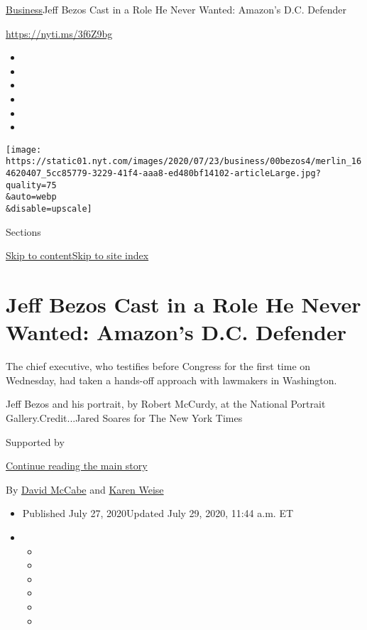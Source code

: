 \href{/section/business}{Business}\textbar{}Jeff Bezos Cast in a Role He
Never Wanted: Amazon's D.C. Defender

\url{https://nyti.ms/3f6Z9bg}

\begin{itemize}
\item
\item
\item
\item
\item
\item
\end{itemize}

\texttt{[image: https://static01.nyt.com/images/2020/07/23/business/00bezos4/merlin\_164620407\_5cc85779-3229-41f4-aaa8-ed480bf14102-articleLarge.jpg?quality=75\\\&auto=webp\\\&disable=upscale]}

Sections

\protect\hyperlink{site-content}{Skip to
content}\protect\hyperlink{site-index}{Skip to site index}

\hypertarget{jeff-bezos-cast-in-a-role-he-never-wanted-amazons-dc-defender}{%
\section{Jeff Bezos Cast in a Role He Never Wanted: Amazon's D.C.
Defender}\label{jeff-bezos-cast-in-a-role-he-never-wanted-amazons-dc-defender}}

The chief executive, who testifies before Congress for the first time on
Wednesday, had taken a hands-off approach with lawmakers in Washington.

Jeff Bezos and his portrait, by Robert McCurdy, at the National Portrait
Gallery.Credit...Jared Soares for The New York Times

Supported by

\protect\hyperlink{after-sponsor}{Continue reading the main story}

By \href{https://www.nytimes.com/by/david-mccabe}{David McCabe} and
\href{https://www.nytimes.com/by/karen-weise}{Karen Weise}

\begin{itemize}
\item
  Published July 27, 2020Updated July 29, 2020, 11:44 a.m. ET
\item
  \begin{itemize}
  \item
  \item
  \item
  \item
  \item
  \item
  \end{itemize}
\end{itemize}

